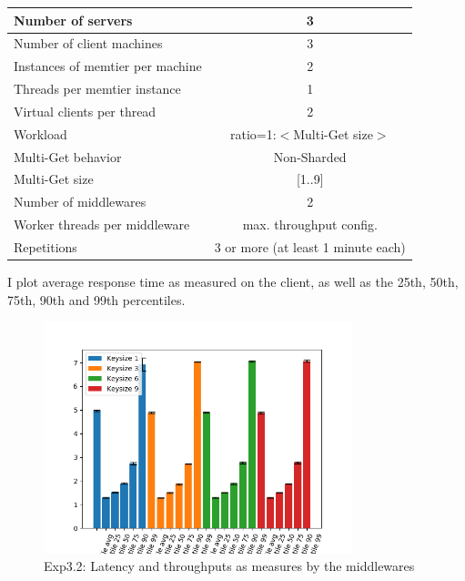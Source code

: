 \documentclass[11pt,a4paper]{article}
\begin{document}
\begin{center}
	\scriptsize{
		\begin{tabular}{|l|c|}
			\hline Number of servers                & 3                       \\ 
			\hline Number of client machines        & 3                       \\ 
			\hline Instances of memtier per machine & 2                       \\ 
			\hline Threads per memtier instance     & 1                       \\
			\hline Virtual clients per thread       & 2                		 \\ 
			\hline Workload                         & ratio=1:$<$Multi-Get size$>$              \\
			\hline Multi-Get behavior               & Non-Sharded             \\
			\hline Multi-Get size                   & [1..9]                  \\
			\hline Number of middlewares            & 2                       \\
			\hline Worker threads per middleware    & max. throughput config. \\
			\hline Repetitions                      & 3 or more (at least 1 minute each)               \\ 
			\hline 
		\end{tabular}
	} 
\end{center}

I plot average response time as measured on the client, as well as the 25th, 50th, 75th, 90th and 99th percentiles.

\begin{figure}[H]
\centering
\includegraphics[width=0.8\textwidth]{img/exp5_1/exp5_1_client_percentile_plots_sharded_False.png}
\caption{Exp3.2: Latency and throughputs as measures by the middlewares}
\label{fig:test}
\end{figure}
\end{document}
